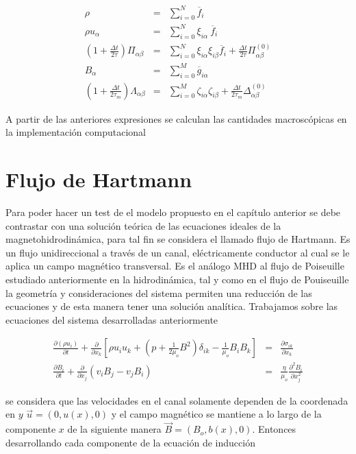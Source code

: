 \begin{eqnarray}
    \rho &=& \sum_{i=0}^{N}\overline{f}_{i}\\
    \rho u_{\alpha}&=&\sum_{i=0}^{N}\xi_{i\alpha}\ \overline{f}_{i}\\
    \left(1+\frac{\Delta t}{2\tau}\right)\Pi_{\alpha\beta}&=&\sum_{i=0}^{N}\xi_{i\alpha}\xi_{i\beta}\overline{f}_{i}+\frac{\Delta t}{2\tau}\Pi_{\alpha\beta}^{(0)}\\
    B_{\alpha} &=& \sum_{i = 0}^{M}\overline{g}_{i\alpha}\\
    \left(1+\frac{\Delta t }{2\tau_{m}}\right)\Lambda_{\alpha\beta}&=&\sum_{i=0}^{M}\zeta_{i\alpha}\zeta_{i\beta}+ \frac{\Delta t}{2\tau_{m}}\Delta_{\alpha\beta}^{(0)}
\end{eqnarray}

\noindent A partir de las anteriores expresiones se calculan las cantidades macroscópicas en la implementación computacional
\noindent 

\section{Flujo de Hartmann}

\noindent Para poder hacer un test de el modelo propuesto en el capítulo anterior se debe contrastar con una solución teórica de las ecuaciones ideales de la magnetohidrodinámica, para tal fin se considera el llamado flujo de Hartmann. Es un flujo unidireccional a través de un canal, eléctricamente conductor al cual se le aplica un campo magnético transversal. Es el análogo MHD al flujo de Poiseuille estudiado anteriormente en la hidrodinámica, tal y como en el flujo de Pouiseuille la geometría y consideraciones del sistema permiten una reducción de las ecuaciones y de esta manera tener una solución analítica. Trabajamos sobre las ecuaciones del sistema desarrolladas anteriormente 

\begin{eqnarray}
    \frac{\partial(\rho u_{i})}{\partial t}+\frac{\partial}{\partial x_{k}}\left[\rho u_{i}u_{k}+\left(p+\frac{1}{2\mu_{o}}B^{2}\right)\delta_{ik}-\frac{1}{\mu_{o}}B_{i}B_{k}\right] &=& \frac{\partial \sigma_{ik}}{\partial x_{k}}\\
    \frac{\partial B_{i}}{\partial t} + \frac{\partial}{\partial x_{j}}(v_{i}B_{j}-v_{j}B_{i}) &=& \frac{\eta}{\mu_{o}}\frac{\partial^{2}B_{i}}{\partial x_{j}^{2}}
\end{eqnarray}

\noindent se considera que las velocidades en el canal solamente dependen de la coordenada en $y$ $\vec{u} = (0,u(x),0)$ y el campo magnético se mantiene a lo largo de la componente $x$ de la siguiente manera
$\vec{B} = (B_{o},b(x),0)$. Entonces desarrollando cada componente de la ecuación de inducción 

